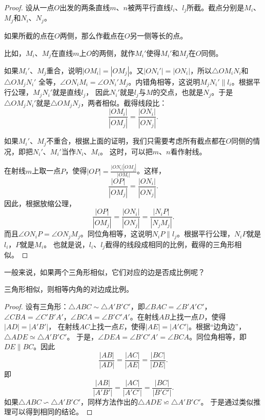 \documentclass[12pt,UTF8,fontset=none]{ctexbook}
\begin{document}
\begin{proof}
    设从一点$O$出发的两条直线$m$、$n$被两平行直线$l_i$、$l_j$所截。截点分别是$M_i$、$M_j$和$N_i$、$N_j$。
    
    如果所截的点在$O$两侧，那么作截点在$O$另一侧等长的点。

    比如，$M_i$、$M_j$在直线$m$上$O$的两侧，就作$M_i'$使得$M_i'$和$M_j$在$O$同侧。

    如果$M_i'$、$M_j$重合，说明$|OM_i| = |OM_j|$。又$|ON_i'| = |ON_i|$，所以$\triangle OM_iN_i$和$\triangle OM_jN_i'$
    全等，$\angle ON_iM_i = \angle ON_i'M_j$。内错角相等，这说明$M_jN_i' \parallel l_i$。根据平行公理，$M_jN_i'$就是直线$l_j$，
    因此$N_i'$就是$l_j$与$M$的交点，也就是$N_j$。于是$\triangle OM_jN_i'$就是$\triangle OM_jN_j$，两者相似。截得线段比：
    $$ \frac{|OM_i|}{|OM_j|} = \frac{|ON_i|}{|ON_j|}.$$

    如果$M_i'$、$M_j$不重合，根据上面的证明，我们只需要考虑所有截点都在$O$同侧的情况，即把$N_i'$、$M_i'$当作$N_i$、$M_i$。
    这时，可以把$m$、$n$看作射线。

    在射线$m$上取一点$P$，使得$|OP| = \frac{|ON_i||OM_j|}{|OM_i|}$。这样，
    $$ \frac{|OP|}{|OM_j|} = \frac{|ON_i|}{|ON_j|}.$$
    因此，根据放缩公理，
    $$ \frac{|OP|}{|OM_j|} = \frac{|ON_i|}{|ON_j|} = \frac{|N_iP|}{|N_jM_j|}.$$
    而且$\angle ON_iP = \angle ON_jM_j$。同位角相等，这说明$N_iP \parallel l_j$。根据平行公理，$N_iP$就是$l_i$，$P$就是$M_i$。
    也就是说，$l_i$、$l_j$截得的线段成相同的比例，截得的三角形相似。

\end{proof}

一般来说，如果两个三角形相似，它们对应的边是否成比例呢？
\begin{tm}\label{tm:0-0-1}
    三角形相似，则相等内角的对边成比例。
\end{tm}
\begin{proof}
    设有三角形：$\triangle ABC \sim \triangle A'B'C'$，即$\angle BAC = \angle B'A'C'$，
    $\angle CBA = \angle C'B'A'$，$\angle BCA = \angle B'C'A'$。在射线$AB$上找一点$D$，使得$|AD| = |A'B'|$，
    在射线$AC$上找一点$E$，使得$|AE| = |A'C'|$。根据“边角边”，$\triangle ADE \simeq \triangle A'B'C'$。
    于是，$\angle DEA = \angle B'C'A' = \angle BCA$。同位角相等，即$DE \parallel BC$。因此
    $$ \frac{|AB|}{|AD|} = \frac{|AC|}{|AE|} = \frac{|BC|}{|DE|}.$$
    即
    $$ \frac{|AB|}{|A'B'|} = \frac{|AC|}{|A'C'|} = \frac{|BC|}{|B'C'|}.$$
    如果$\triangle ABC \backsim \triangle A'B'C'$，同样方法作出的$\triangle ADE \backsimeq \triangle A'B'C'$。
    于是通过类似推理可以得到相同的结论。
\end{proof}
\end{document}
